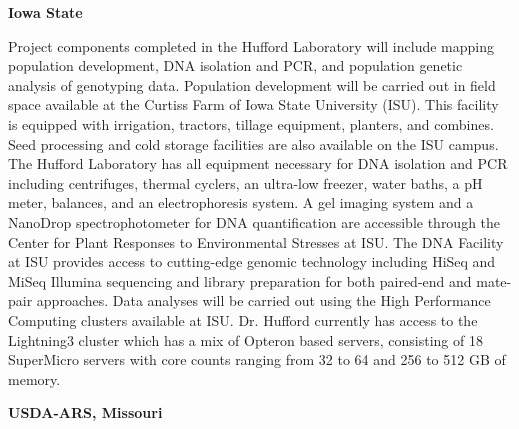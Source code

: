 \textbf{Iowa State}

Project components completed in the Hufford Laboratory will include mapping population development, DNA isolation and PCR, and population genetic analysis of genotyping data. Population development will be carried out in field space available at the Curtiss Farm of Iowa State University (ISU).  This facility is equipped with irrigation, tractors, tillage equipment, planters, and combines.  Seed processing and cold storage facilities are also available on the ISU campus.  The Hufford Laboratory has all equipment necessary for DNA isolation and PCR including centrifuges, thermal cyclers, an ultra-low freezer, water baths, a pH meter, balances, and an electrophoresis system. A gel imaging system and a NanoDrop spectrophotometer for DNA quantification are accessible through the Center for Plant Responses to Environmental Stresses at ISU. The DNA Facility at ISU provides access to cutting-edge genomic technology including HiSeq and MiSeq Illumina sequencing and library preparation for both paired-end and mate-pair approaches.  Data analyses will be carried out using the High Performance Computing clusters available at ISU. Dr. Hufford currently has access to the Lightning3 cluster which has a mix of Opteron based servers, consisting of 18 SuperMicro servers with core counts ranging from 32 to 64 and 256 to 512 GB of memory.

\textbf{USDA-ARS, Missouri}

